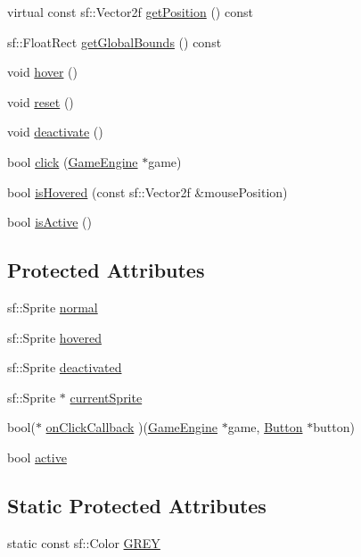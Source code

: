 \begin{DoxyCompactItemize}
virtual const sf\+::\+Vector2f \mbox{\hyperlink{class_button_a01ff4aace35c7d0c4d8b35eda290378f}{get\+Position}} () const
\item 
sf\+::\+Float\+Rect \mbox{\hyperlink{class_button_ab9d2e98e4940309543a9c94509f99437}{get\+Global\+Bounds}} () const
\item 
void \mbox{\hyperlink{class_button_a1a5ca19ed8efe0ea27625217dcab9f2c}{hover}} ()
\item 
void \mbox{\hyperlink{class_button_ae34e8f3c482654e8585360fd639d02e3}{reset}} ()
\item 
void \mbox{\hyperlink{class_button_a57efb09b51a4846a25e7f61abee78cd6}{deactivate}} ()
\item 
bool \mbox{\hyperlink{class_button_ac5e8ae25dcb8a33c6e8711ddbaed71bf}{click}} (\mbox{\hyperlink{class_game_engine}{Game\+Engine}} $\ast$game)
\item 
bool \mbox{\hyperlink{class_button_a4d1a833e7e928d2fe25db3ba28f53e40}{is\+Hovered}} (const sf\+::\+Vector2f \&mouse\+Position)
\item 
bool \mbox{\hyperlink{class_button_acf2ea3a5fea9e6cb24b291fabab033ff}{is\+Active}} ()
\end{DoxyCompactItemize}
\subsection*{Protected Attributes}
\begin{DoxyCompactItemize}
\item 
sf\+::\+Sprite \mbox{\hyperlink{class_button_a5a2a5e1c6b378762f5b2fe39e9053d9e}{normal}}
\item 
sf\+::\+Sprite \mbox{\hyperlink{class_button_a181477cb3462763b510a30a4f27cd756}{hovered}}
\item 
sf\+::\+Sprite \mbox{\hyperlink{class_button_a85f7fc9ea9ff8aae240469b0bddb662a}{deactivated}}
\item 
sf\+::\+Sprite $\ast$ \mbox{\hyperlink{class_button_ae43bb88d6b390a0ab6607278102952c4}{current\+Sprite}}
\item 
bool($\ast$ \mbox{\hyperlink{class_button_abd70dfccd5cce2eb6d4cae1d684107c3}{on\+Click\+Callback}} )(\mbox{\hyperlink{class_game_engine}{Game\+Engine}} $\ast$game, \mbox{\hyperlink{class_button}{Button}} $\ast$button)
\item 
bool \mbox{\hyperlink{class_button_a03070c78335786c482088bf00c894325}{active}}
\end{DoxyCompactItemize}
\subsection*{Static Protected Attributes}
\begin{DoxyCompactItemize}
\item 
static const sf\+::\+Color \mbox{\hyperlink{class_button_afc0927052e6f57f0cfc7521953421617}{G\+R\+EY}}
\end{DoxyCompactItemize}


